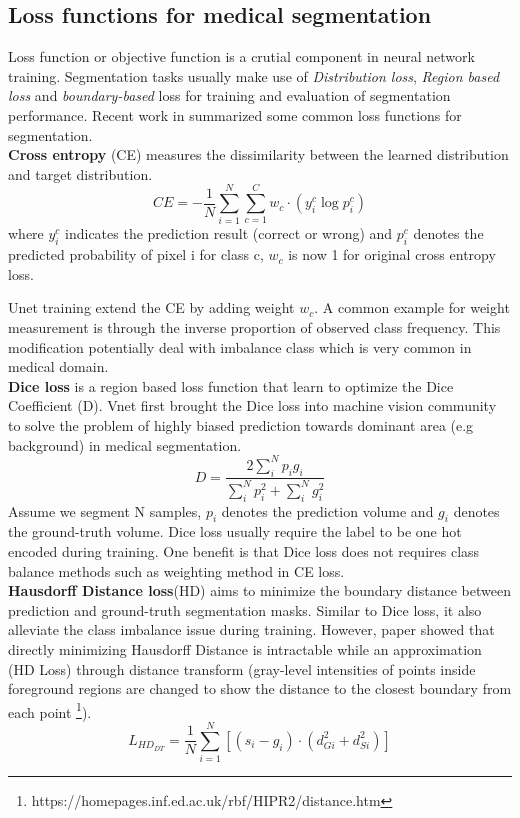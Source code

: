 \subsection{Loss functions for medical segmentation}

Loss function or objective function is a crutial component in neural network training. Segmentation tasks usually make use of \textit{Distribution loss}, \textit{Region based loss} and \textit{boundary-based} loss for training and evaluation of segmentation performance. Recent work in \cite{ma_segmentation_2020} summarized some common loss functions for segmentation. \\

\textbf{Cross entropy} (CE) measures the dissimilarity between the learned distribution and target distribution. 
$$CE = -\frac{1}{N} \sum_{i=1}^{N} \sum_{c=1}^{C} w_{c} \cdot (y_{i}^{c} \log p_{i}^{c})$$ where $y_{i}^{c}$ indicates the prediction result (correct or wrong) and $p_{i}^{c}$ denotes the predicted probability of pixel i for class c, $w_{c}$ is now 1 for original cross entropy loss.

Unet \cite{ronneberger_u-net_2015} training extend the CE by adding weight $w_{c}$. A common example for weight measurement is through the inverse proportion of observed class frequency. This modification potentially deal with imbalance class which is very common in medical domain.\\

\textbf{Dice loss} is a region based loss function that learn to optimize the Dice Coefficient (D). Vnet \cite{milletari_v-net_2016} first brought the Dice loss into machine vision community to solve the problem of highly biased prediction towards dominant area (e.g background) in medical segmentation.
 $$D=\frac{2 \sum_{i}^{N} p_{i} g_{i}}{\sum_{i}^{N} p_{i}^{2}+\sum_{i}^{N} g_{i}^{2}}$$
 Assume we segment N samples, $p_{i}$ denotes the prediction volume and $g_{i}$ denotes the ground-truth volume.
Dice loss usually require the label to be one hot encoded during training. One benefit is that Dice loss does not requires class balance methods such as weighting method in CE loss.\\

\textbf{Hausdorff Distance loss}(HD) aims to minimize the boundary distance between prediction and ground-truth segmentation masks. Similar to Dice loss, it also alleviate the class imbalance issue during training. However, paper \cite{} showed that directly minimizing Hausdorff Distance is intractable while an approximation (HD Loss) through distance transform (gray-level intensities of points inside foreground regions are changed to show the distance to the closest boundary from each point \footnote{https://homepages.inf.ed.ac.uk/rbf/HIPR2/distance.htm}).
$$L_{H D_{D T}}=\frac{1}{N} \sum_{i=1}^{N}\left[\left(s_{i}-g_{i}\right) \cdot\left(d_{G i}^{2}+d_{S i}^{2}\right)\right]$$

